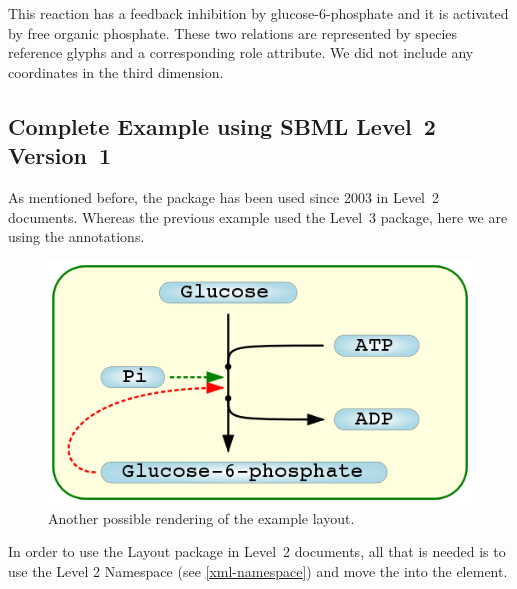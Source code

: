 This reaction has a feedback inhibition by glucose-6-phosphate and it is 
activated by free organic phosphate. These two relations are represented 
by species reference glyphs and a corresponding role attribute. We did 
not include any coordinates in the third dimension. 

\pagebreak
\subsection{Complete Example using SBML Level~2 Version~1}
\label{l2example}
As mentioned before, the \Layout package has been used since 2003 in 
\SBML Level~2 documents. Whereas the previous example used the Level~3 
package, here we are using the \SBML annotations. 

\begin{figure}[!ht]
\includegraphics[scale=0.5]{figures/TestModel3-g++}
\caption{Another possible rendering of the example layout.}
\end{figure}

In order to use the Layout package in \SBML Level~2 documents, all that 
is needed is to use the Level 2 Namespace (see \ref{xml-namespace}) and 
move the \ListOfLayouts into the \Model {} element. 




